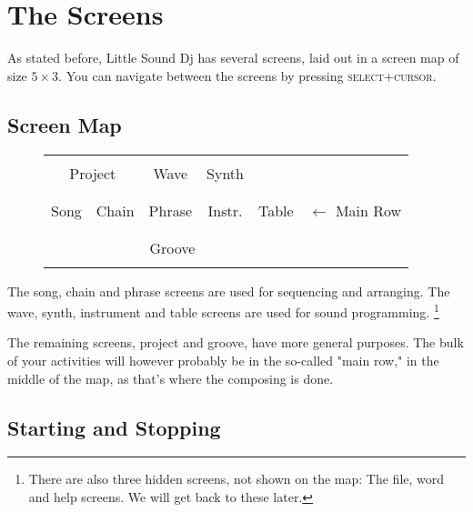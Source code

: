\chapter{The Screens}
As stated before, Little Sound Dj has several screens, laid out in a screen map of size \begin{math} 5 \times 3 \end{math}. You can
navigate between the screens by pressing \textsc{select+cursor}.
\section{Screen Map}
\begin{figure}[htbp]
\centering
\begin{tabular}{|c|c|c|c|c|l}

	\cline{0-4}
	\multicolumn{2}{|c|}{ } & & & &
	\\
	\multicolumn{2}{|c|}{Project} & Wave & Synth & &
	\\
	\multicolumn{2}{|c|}{ } & & & &
	\\
	\cline{0-3}
	& & & & & \\
	Song & Chain & Phrase & Instr. & Table  & \begin{math} \leftarrow \end{math} Main Row \\
	& & & & & \\
	\cline{0-4}
	\multicolumn{5}{|c|}{} \\
	\multicolumn{5}{|c|}{Groove} \\
	\multicolumn{5}{|c|}{} \\
	\cline{0-4}
\end{tabular}
\end{figure}

The song, chain and phrase screens are used for sequencing and arranging. The wave, synth,
instrument and table screens are used for sound programming. \footnote{There are also three hidden
screens, not shown on the map: The file, word and help screens. We will get back to these later.}

The remaining screens, project and groove, have more general purposes. The bulk of your activities will however probably be in the so-called "main row," in the middle of the map, as that's where the composing is done.

\section{Starting and Stopping}

